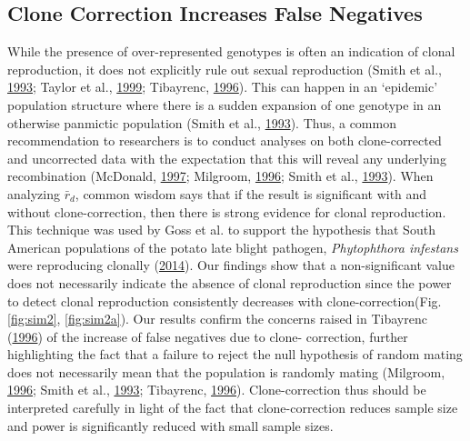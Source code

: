 \documentclass[double,11pt]{beavtex}
\begin{document}
  \subsection{Clone Correction Increases False
  Negatives}\label{clone-correction-increases-false-negatives}
  
  While the presence of over-represented genotypes is often an indication
  of clonal reproduction, it does not explicitly rule out sexual
  reproduction (Smith et al., \protect\hyperlink{ref-smith1993how}{1993};
  Taylor et al., \protect\hyperlink{ref-taylor1999evolutionary}{1999};
  Tibayrenc, \protect\hyperlink{ref-tibayrenc1996towards}{1996}). This can
  happen in an `epidemic' population structure where there is a sudden
  expansion of one genotype in an otherwise panmictic population (Smith et
  al., \protect\hyperlink{ref-smith1993how}{1993}). Thus, a common
  recommendation to researchers is to conduct analyses on both
  clone-corrected and uncorrected data with the expectation that this will
  reveal any underlying recombination (McDonald,
  \protect\hyperlink{ref-mcdonald1997population}{1997}; Milgroom,
  \protect\hyperlink{ref-milgroom1996recombination}{1996}; Smith et al.,
  \protect\hyperlink{ref-smith1993how}{1993}). When analyzing
  \(\bar{r}_d\), common wisdom says that if the result is significant with
  and without clone-correction, then there is strong evidence for clonal
  reproduction. This technique was used by Goss et al. to support the
  hypothesis that South American populations of the potato late blight
  pathogen, \emph{Phytophthora infestans} were reproducing clonally
  (\protect\hyperlink{ref-goss2014irish}{2014}). Our findings show that a
  non-significant value does not necessarily indicate the absence of
  clonal reproduction since the power to detect clonal reproduction
  consistently decreases with clone-correction(Fig. \ref{fig:sim2},
  \ref{fig:sim2a}). Our results confirm the concerns raised in Tibayrenc
  (\protect\hyperlink{ref-tibayrenc1996towards}{1996}) of the increase of
  false negatives due to clone- correction, further highlighting the fact
  that a failure to reject the null hypothesis of random mating does not
  necessarily mean that the population is randomly mating (Milgroom,
  \protect\hyperlink{ref-milgroom1996recombination}{1996}; Smith et al.,
  \protect\hyperlink{ref-smith1993how}{1993}; Tibayrenc,
  \protect\hyperlink{ref-tibayrenc1996towards}{1996}). Clone-correction
  thus should be interpreted carefully in light of the fact that
  clone-correction reduces sample size and power is significantly reduced
  with small sample sizes.
  
\end{document}
